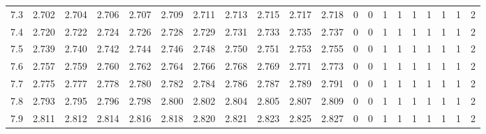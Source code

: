 \begin{table}[H]
{\begin{tabular}{|c|c|c|c|c|c|c|c|c|c|c|c|c|c|c|c|c|c|c|c|}
        7.3 & 2.702 & 2.704 & 2.706 & 2.707 & 2.709 & 2.711 & 2.713 & 2.715 & 2.717 & 2.718 & 0 & 0 & 1 & 1 & 1 & 1 & 1 & 1 & 2 \\
        7.4 & 2.720 & 2.722 & 2.724 & 2.726 & 2.728 & 2.729 & 2.731 & 2.733 & 2.735 & 2.737 & 0 & 0 & 1 & 1 & 1 & 1 & 1 & 1 & 2 \\
        7.5 & 2.739 & 2.740 & 2.742 & 2.744 & 2.746 & 2.748 & 2.750 & 2.751 & 2.753 & 2.755 & 0 & 0 & 1 & 1 & 1 & 1 & 1 & 1 & 2 \\
        7.6 & 2.757 & 2.759 & 2.760 & 2.762 & 2.764 & 2.766 & 2.768 & 2.769 & 2.771 & 2.773 & 0 & 0 & 1 & 1 & 1 & 1 & 1 & 1 & 2 \\
        7.7 & 2.775 & 2.777 & 2.778 & 2.780 & 2.782 & 2.784 & 2.786 & 2.787 & 2.789 & 2.791 & 0 & 0 & 1 & 1 & 1 & 1 & 1 & 1 & 2 \\
        7.8 & 2.793 & 2.795 & 2.796 & 2.798 & 2.800 & 2.802 & 2.804 & 2.805 & 2.807 & 2.809 & 0 & 0 & 1 & 1 & 1 & 1 & 1 & 1 & 2 \\
        7.9 & 2.811 & 2.812 & 2.814 & 2.816 & 2.818 & 2.820 & 2.821 & 2.823 & 2.825 & 2.827 & 0 & 0 & 1 & 1 & 1 & 1 & 1 & 1 & 2 \\
        \hline
    \end{tabular}%
    }
\end{table}
